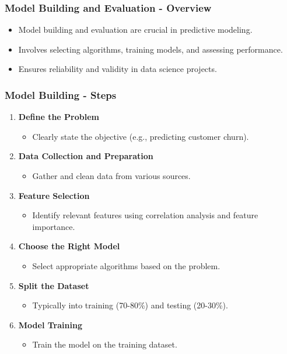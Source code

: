 \documentclass{beamer}
\begin{document}
\begin{frame}[fragile]
    \frametitle{Model Building and Evaluation - Overview}
    \begin{itemize}
        \item Model building and evaluation are crucial in predictive modeling.
        \item Involves selecting algorithms, training models, and assessing performance.
        \item Ensures reliability and validity in data science projects.
    \end{itemize}
\end{frame}

\begin{frame}[fragile]
    \frametitle{Model Building - Steps}
    \begin{enumerate}
        \item \textbf{Define the Problem}
            \begin{itemize}
                \item Clearly state the objective (e.g., predicting customer churn).
            \end{itemize}
        \item \textbf{Data Collection and Preparation}
            \begin{itemize}
                \item Gather and clean data from various sources.
            \end{itemize}
        \item \textbf{Feature Selection}
            \begin{itemize}
                \item Identify relevant features using correlation analysis and feature importance.
            \end{itemize}
        \item \textbf{Choose the Right Model}
            \begin{itemize}
                \item Select appropriate algorithms based on the problem.
            \end{itemize}
        \item \textbf{Split the Dataset}
            \begin{itemize}
                \item Typically into training (70-80\%) and testing (20-30\%).
            \end{itemize}
        \item \textbf{Model Training}
            \begin{itemize}
                \item Train the model on the training dataset.
            \end{itemize}
    \end{enumerate}
\end{frame}
\end{document}

